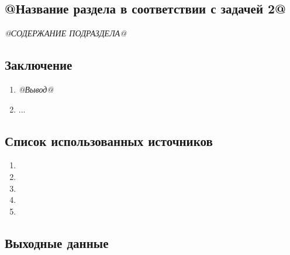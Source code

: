 \subsection{@Название раздела в соответствии с задачей 2@}

\textit{@СОДЕРЖАНИЕ ПОДРАЗДЕЛА@}

\subsection*{Заключение}

\begin{enumerate}
	\item \textit{@Вывод@}
	\item ...
\end{enumerate}

\subsection*{Список использованных источников}

\begin{enumerate}
	\item {}
	\item {}
	\item {}
	\item {}
	\item {}
\end{enumerate}

\subsection*{Выходные данные}

\textit{\DocOutReference}


